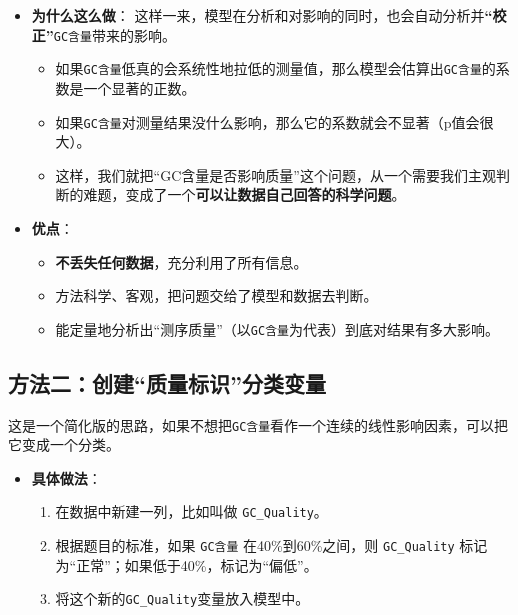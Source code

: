 \documentclass[a4paper, oneside, 12pt]{article}
\begin{document}
\begin{aireport}
{\begin{itemize}
        \item \textbf{为什么这么做}：
            这样一来，模型在分析和对影响的同时，也会自动分析并\textbf{“校正”}\texttt{GC含量}带来的影响。
            \begin{itemize}
                \item 如果\texttt{GC含量}低真的会系统性地拉低的测量值，那么模型会估算出\texttt{GC含量}的系数是一个显著的正数。
                \item 如果\texttt{GC含量}对测量结果没什么影响，那么它的系数就会不显著（p值会很大）。
                \item 这样，我们就把“GC含量是否影响质量”这个问题，从一个需要我们主观判断的难题，变成了一个\textbf{可以让数据自己回答的科学问题}。
            \end{itemize}
        
        \item \textbf{优点}：
            \begin{itemize}
                \item \textbf{不丢失任何数据}，充分利用了所有信息。
                \item 方法科学、客观，把问题交给了模型和数据去判断。
                \item 能定量地分析出“测序质量”（以\texttt{GC含量}为代表）到底对结果有多大影响。
            \end{itemize}
    \end{itemize}

    \subsection*{方法二：创建“质量标识”分类变量}

    这是一个简化版的思路，如果不想把\texttt{GC含量}看作一个连续的线性影响因素，可以把它变成一个分类。

    \begin{itemize}
        \item \textbf{具体做法}：
            \begin{enumerate}
                \item 在数据中新建一列，比如叫做 \texttt{GC\_Quality}。
                \item 根据题目的标准，如果 \texttt{GC含量} 在40\%到60\%之间，则 \texttt{GC\_Quality} 标记为“正常”；如果低于40\%，标记为“偏低”。
                \item 将这个新的\texttt{GC\_Quality}变量放入模型中。
            \end{enumerate}
        

\end{itemize}}
\end{aireport}
\end{document}
